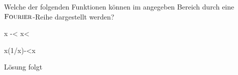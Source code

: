 \documentclass{atistandalonetask}
\begin{document}
  \begin{atiTask}[
    title = \textsc{Dirichlet}-Bedingungen
  ]
  
  Welche der folgenden Funktionen können im angegeben Bereich durch eine $\textsc{Fourier}$-Reihe dargestellt werden?
  \begin{atiSubequations}
  \item{\tan x \quad -\infty < x< \infty}
  \item{x\sin\left(1/x\right)\quad -<x\leq {}}
  \end{atiSubequations}
  \end{atiTask}
  \begin{atiSolution}
   	Lösung folgt
  \end{atiSolution}
\end{document}
